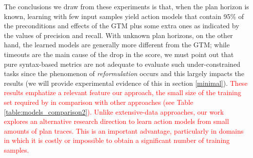 The conclusions we draw from these experiments is that, when the plan horizon is known, learning with few input samples yield action models that contain 95\% of the preconditions and effects of the GTM plus some extra ones as indicated by the values of precision and recall. With unknown plan horizons, on the other hand, the learned models are generally more different from the GTM; while timeouts are the main cause of the drop in the score, we must point out that pure syntax-based metrics are not adequate to evaluate such under-constrained tasks since the phenomenon of \emph{reformulation} occurs and this largely impacts the results (we will provide experimental evidence of this in section \ref{minimal}). \textcolor{red}{These results emphatize a relevant feature our approach, the small size of the training set required by \FAMA in comparison with other approaches (see Table \ref{table:models_comparison2}). Unlike extensive-data approaches, our work explores an alternative research direction to learn action models from small amounts of plan traces. This is an important advantage, particularly in domains in which it is costly or impossible to obtain a significant number of training samples.}





